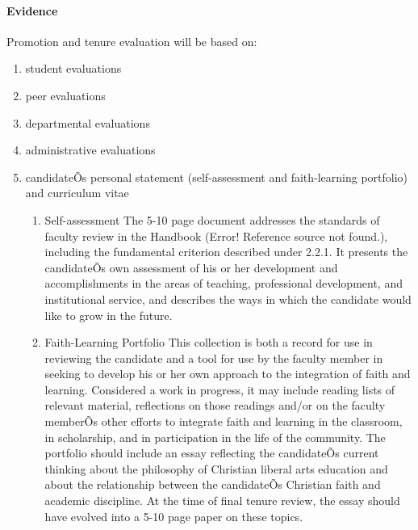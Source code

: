 \documentclass[letterpaper, 11pt]{article}
\begin{document}
			\paragraph{Evidence}
				Promotion and tenure evaluation will be based on:
				\begin{enumerate}[label=\alph*)]
					\item{student evaluations}
					\item{peer evaluations}
					\item{departmental evaluations}
					\item{administrative evaluations}
					\item{candidateÕs personal statement (self-assessment and faith-learning portfolio) and curriculum vitae
						\begin{enumerate}[label=\arabic*)]
							\item{Self-assessment}
							The 5-10 page document addresses the standards of faculty review in the Handbook (Error! Reference source not found.), including the fundamental criterion described under 2.2.1.  It presents the candidateÕs own assessment of his or her development and accomplishments in the areas of teaching, professional development, and institutional service, and describes the ways in which the candidate would like to grow in the future.
							\item{Faith-Learning Portfolio}
							This collection is both a record for use in reviewing the candidate and a tool for use by the faculty member in seeking to develop his or her own approach to the integration of faith and learning.  Considered a work in progress, it may include reading lists of relevant material, reflections on those readings and/or on the faculty memberÕs other efforts to integrate faith and learning in the classroom, in scholarship, and in participation in the life of the community.  The portfolio should include an essay reflecting the candidateÕs current thinking about the philosophy of Christian liberal arts education and about the relationship between the candidateÕs Christian faith and academic discipline.  At the time of final tenure review, the essay should have evolved into a 5-10 page paper on these topics.
						\end{enumerate}
					}
				\end{enumerate}
\end{document}

